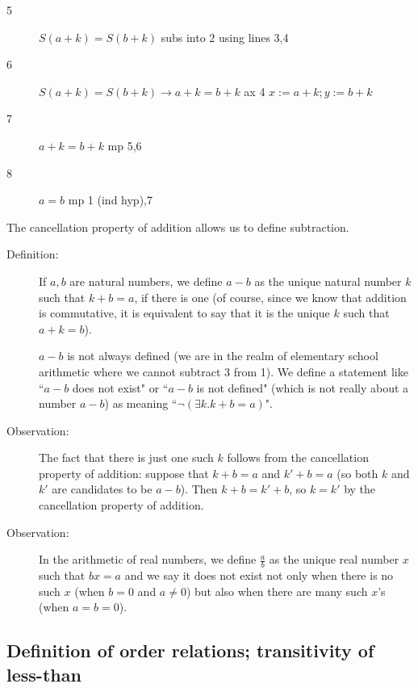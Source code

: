 \documentclass[12pt]{article}
\begin{document}
\begin{description}
\begin{description}
\begin{description}
\begin{description}
\item[5]  $S(a+k)=S(b+k)$  subs into 2 using lines 3,4

\item[6]  $S(a+k)=S(b+k) \rightarrow a+k=b+k$ ax 4 $x:=a+k; y:=b+k$

\item[7]  $a+k=b+k$  mp 5,6

\item[8]  $a=b$  mp 1 (ind hyp),7

\end{description}

\end{description}

\end{description}

\end{description}

The cancellation property of addition allows us to define subtraction.

\begin{description}

\item[Definition:]  If $a,b$ are natural numbers, we define $a-b$ as the unique natural number $k$
such that $k+b=a$, if there is one (of course, since we know that addition is commutative, it is equivalent to say that it is the unique $k$ such that $a+k=b$).

$a-b$ is not always defined (we are in the realm of elementary school arithmetic where we cannot subtract 3 from 1).  We define a statement like ``$a-b$ does not exist"  or ``$a-b$ is not defined" (which is not really about a number $a-b$) as meaning ``$\neg(\exists k.k+b=a)$".

\item[Observation:]  The fact that there is just one such $k$ follows from the cancellation property of addition:
suppose that $k+b=a$ and $k'+b=a$ (so both $k$ and $k'$ are candidates to be $a-b$).  Then $k+b=k'+b$, so $k=k'$
by the cancellation property of addition.

\item[Observation:]  In the arithmetic of real numbers, we define $\frac ab$ as the unique real number $x$ such that $bx=a$
and we say it does not exist not only when there is no such $x$ (when $b=0$ and $a \neq 0$) but also when there are many such $x$'s
(when $a=b=0$).


\end{description}

\subsection{Definition of order relations; transitivity of less-than}
\end{document}
